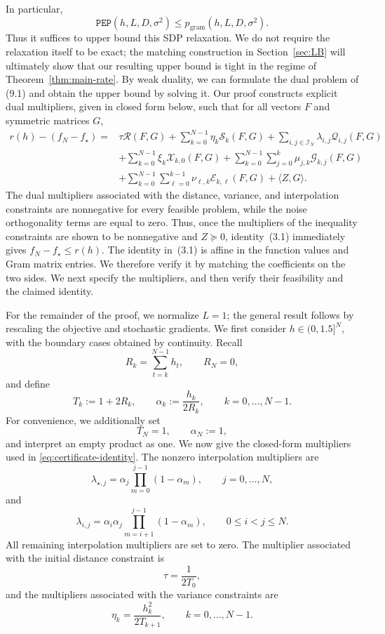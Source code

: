 In particular, \[ \mathtt{PEP}(h,L,D,\sigma^2) \leq p_{\mathrm{gram}}(h,L,D,\sigma^2).\]
Thus it suffices to upper bound this SDP relaxation. We do not require
the relaxation itself to be exact; the matching construction in
Section~\ref{sec:LB} will ultimately show that our resulting upper bound
is tight in the regime of Theorem~\ref{thm:main-rate}.
By weak duality, we can formulate the dual problem of (9.1) and obtain the upper bound by solving it.
Our proof constructs explicit dual multipliers, given in closed form below, such that for all vectors $F$ and symmetric matrices $G$, \begin{equation}\label{eq:certificate-identity}
\begin{aligned}
r(h)-(f_N-f_\star) ={}& \tau \mathcal{R}(F,G) +\sum_{k=0}^{N-1}\eta_k \mathcal{S}_k(F,G) +\sum_{i,j\in\mathcal{I}_N}\lambda_{i,j}\mathcal{Q}_{i,j}(F,G) \\
&+ \sum_{k=0}^{N-1}\xi_k\mathcal{X}_{k,0}(F,G) +
\sum_{k=0}^{N-1}\sum_{j=0}^{k} \mu_{j,k}\mathcal{G}_{k,j}(F,G) \\
&+ \sum_{k=0}^{N-1}\sum_{\ell=0}^{k-1} \nu_{\ell,k}\mathcal{E}_{k,\ell}(F,G)
+ \langle Z,G\rangle .
\end{aligned}
\tag{3.1}
\end{equation}
The dual multipliers associated with the distance, variance, and interpolation constraints are nonnegative for every feasible problem, while the noise orthogonality terms are equal to zero. Thus, once the multipliers of the inequality constraints are shown to be nonnegative and $Z\succeq0$, identity~(3.1) immediately gives $f_N-f_\star\leq r(h)$.
The identity in~(3.1) is affine in the function values and Gram matrix entries. We therefore verify it by matching the coefficients on the two sides. We next specify the multipliers, and then verify their feasibility and the claimed identity.

For the remainder of the proof, we normalize $L=1$; the general result follows by rescaling the objective and stochastic gradients. We first consider $h\in(0,1.5]^N$, with the boundary cases obtained by continuity.
Recall\[R_k=\sum_{t=k}^{N-1}h_t,\qquad R_N=0,\] and define
\[ T_k:=1+2R_k, \qquad \alpha_k:=\frac{h_k}{2R_k}, \qquad k=0,\ldots,N-1. \]
For convenience, we additionally set
\[ T_N=1, \qquad \alpha_N:=1, \]
and interpret an empty product as one.
We now give the closed-form multipliers used in
\eqref{eq:certificate-identity}. The nonzero interpolation multipliers
are \[ \lambda_{\star,j} = \alpha_j \prod_{m=0}^{j-1}(1-\alpha_m), \qquad
j=0,\ldots,N, \]
and \[ \lambda_{i,j} = \alpha_i\alpha_j \prod_{m=i+1}^{j-1}(1-\alpha_m),
\qquad 0\leq i<j\leq N. \]
All remaining interpolation multipliers are set to zero.
The multiplier associated with the initial distance constraint is
\[ \tau=\frac{1}{2T_0}, \]
and the multipliers associated with the variance constraints are
\[ \eta_k=\frac{h_k^2}{2T_{k+1}}, \qquad k=0,\ldots,N-1. \]

